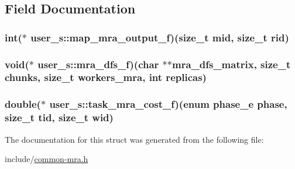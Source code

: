 \subsection{\-Field \-Documentation}
\hypertarget{structuser__s_ab9a47b1668a675fb95ca6489d1da13a7}{
\subsubsection[{map\-\_\-mra\-\_\-output\-\_\-f}]{\setlength{\rightskip}{0pt plus 5cm}int($\ast$ {\bf user\-\_\-s\-::map\-\_\-mra\-\_\-output\-\_\-f})(size\-\_\-t mid, size\-\_\-t rid)}}\label{structuser__s_ab9a47b1668a675fb95ca6489d1da13a7}
\hypertarget{structuser__s_a832e7d465f899e75aa7fe1d72987c5d2}{
\subsubsection[{mra\-\_\-dfs\-\_\-f}]{\setlength{\rightskip}{0pt plus 5cm}void($\ast$ {\bf user\-\_\-s\-::mra\-\_\-dfs\-\_\-f})(char $\ast$$\ast$mra\-\_\-dfs\-\_\-matrix, size\-\_\-t chunks, size\-\_\-t workers\-\_\-mra, int replicas)}}\label{structuser__s_a832e7d465f899e75aa7fe1d72987c5d2}
\hypertarget{structuser__s_aa32af3ea6ee92e53a04476911d65f2c1}{
\subsubsection[{task\-\_\-mra\-\_\-cost\-\_\-f}]{\setlength{\rightskip}{0pt plus 5cm}double($\ast$ {\bf user\-\_\-s\-::task\-\_\-mra\-\_\-cost\-\_\-f})(enum {\bf phase\-\_\-e} phase, size\-\_\-t tid, size\-\_\-t wid)}}\label{structuser__s_aa32af3ea6ee92e53a04476911d65f2c1}


\-The documentation for this struct was generated from the following file\-:\begin{DoxyCompactItemize}
\item 
include/\hyperlink{common-mra_8h}{common-\/mra.\-h}\end{DoxyCompactItemize}
